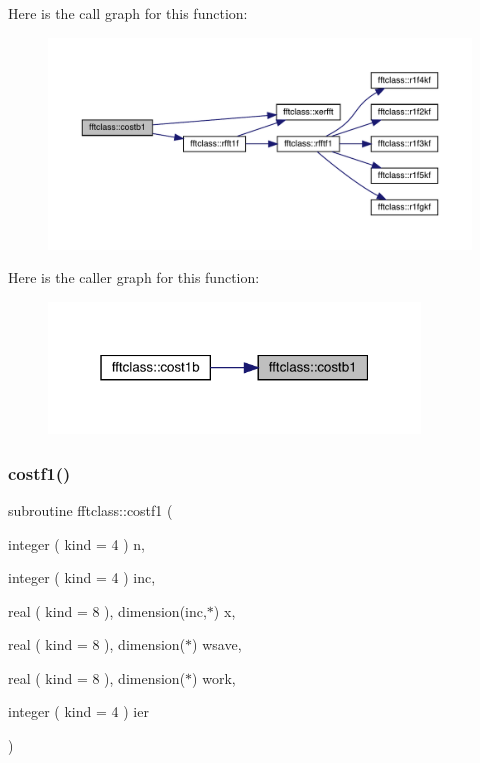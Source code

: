 Here is the call graph for this function\+:\nopagebreak
\begin{figure}[H]
\begin{center}
\leavevmode
\includegraphics[width=350pt]{namespacefftclass_a2769de58926e8dc80c0fa9f862de7dce_cgraph}
\end{center}
\end{figure}
Here is the caller graph for this function\+:\nopagebreak
\begin{figure}[H]
\begin{center}
\leavevmode
\includegraphics[width=280pt]{namespacefftclass_a2769de58926e8dc80c0fa9f862de7dce_icgraph}
\end{center}
\end{figure}
\mbox{\label{namespacefftclass_af419be9c656e387f89facc1033cf4f55}} 
\subsubsection{\texorpdfstring{costf1()}{costf1()}}
{\footnotesize\ttfamily subroutine fftclass\+::costf1 (\begin{DoxyParamCaption}\item[{integer ( kind = 4 )}]{n,  }\item[{integer ( kind = 4 )}]{inc,  }\item[{real ( kind = 8 ), dimension(inc,$\ast$)}]{x,  }\item[{real ( kind = 8 ), dimension($\ast$)}]{wsave,  }\item[{real ( kind = 8 ), dimension($\ast$)}]{work,  }\item[{integer ( kind = 4 )}]{ier }\end{DoxyParamCaption})}

